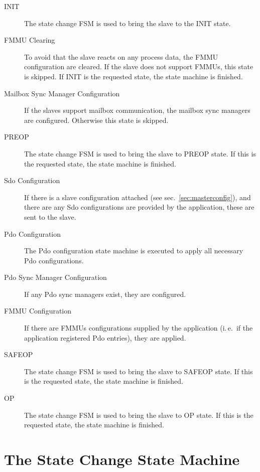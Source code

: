 \documentclass[a4paper,12pt,BCOR6mm,bibtotoc,idxtotoc]{scrbook}
\begin{document}
\begin{description}

\item[INIT] The state change FSM is used to bring the slave to the INIT state.

\item[FMMU Clearing] To avoid that the slave reacts on any process data, the
FMMU configuration are cleared. If the slave does not support FMMUs, this
state is skipped. If INIT is the requested state, the state machine is
finished.

\item[Mailbox Sync Manager Configuration] If the slaves support mailbox
communication, the mailbox sync managers are configured. Otherwise this state
is skipped.

\item[PREOP] The state change FSM is used to bring the slave to PREOP state.
If this is the requested state, the state machine is finished.

\item[Sdo Configuration] If there is a slave configuration attached (see
sec.~\ref{sec:masterconfig}), and there are any Sdo configurations are
provided by the application, these are sent to the slave.

\item[Pdo Configuration] The Pdo configuration state machine is executed to
apply all necessary Pdo configurations.

\item[Pdo Sync Manager Configuration] If any Pdo sync managers exist, they are
configured.

\item[FMMU Configuration] If there are FMMUs configurations supplied by the
application (i.\,e.\ if the application registered Pdo entries), they are
applied. 

\item[SAFEOP] The state change FSM is used to bring the slave to SAFEOP state.
If this is the requested state, the state machine is finished.

\item[OP] The state change FSM is used to bring the slave to OP state.
If this is the requested state, the state machine is finished.

\end{description}


\section{The State Change State Machine}
\label{sec:fsm-change}
\end{document}
